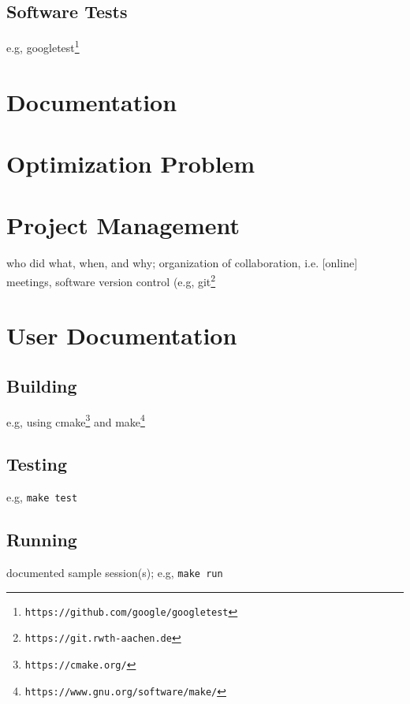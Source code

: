 \documentclass{article}
\begin{document}
\subsection{Software Tests}

e.g, googletest\footnote{\tt https://github.com/google/googletest}

\section{Documentation}\label{ch:doc}

\section{Optimization Problem}\label{ch:optimization-problem}


\section{Project Management} \label{ch:projectmanagement}

who did what, when, and why; organization of collaboration, i.e. [online] meetings, software version control (e.g, git\footnote{\tt https://git.rwth-aachen.de}




\appendix

\section{User Documentation} \label{ch:userdoc}

\subsection{Building}

e.g, using cmake\footnote{\tt https://cmake.org/} and make\footnote{\tt https://www.gnu.org/software/make/}


\subsection{Testing}

e.g, \verb!make test!

\subsection{Running}

documented sample session(s); e.g, \verb!make run!
\end{document}
